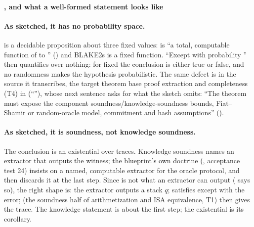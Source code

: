 \paragraph{\texorpdfstring{}{baseVerifier_extractsExecution}, and what a well-formed statement looks like}\label{sec:gen-opening-extracts}

\paragraph{As sketched, it has no probability space.}  is a
decidable proposition about three fixed values:  is ``a total, computable function of
 to '' () and BLAKE2s is a fixed function.
``Except with probability '' then quantifies over nothing: for fixed
 the conclusion  is either true or
false, and no randomness makes the hypothesis probabilistic. The same defect is in the source it
transcribes, the target theorem base proof extraction and completeness (T4) in  (``''),
whose next sentence asks for what the sketch omits: ``The theorem must expose the component
soundness/knowledge-soundness bounds, Fiat--Shamir or random-oracle model, commitment and hash
assumptions'' ().

\paragraph{As sketched, it is soundness, not knowledge soundness.} The conclusion is an existential
over traces. Knowledge soundness names an extractor that outputs the witness; the blueprint's own
doctrine (, acceptance test 24) insists on a named, computable extractor for the
oracle protocol, and then discards it at the last step. Since  is not what an
extractor can output ( says so), the right shape is: the extractor outputs a stack
$q$;  satisfies  except with the error;
 (the soundness half of arithmetization and ISA equivalence, T1) then gives the trace. The knowledge statement is
about the first step; the existential is its corollary.


